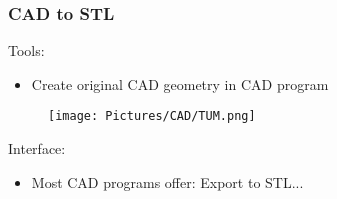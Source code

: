 
\begin{frame}
	\frametitle{CAD to STL}
	\begin{minipage}{0.85\textwidth}
	Tools:
		\begin{itemize}
		\item Create original CAD geometry in CAD program
		\end{itemize}
		\begin{figure}
		\texttt{[image: Pictures/CAD/TUM.png]}
		\end{figure}
		Interface:
		\begin{itemize}
		\item Most CAD programs offer: Export to STL...
		\end{itemize}
	\begin{figure}
	\end{figure}
	\end{minipage}
	\begin{minipage}{0.14\textwidth}
		\begin{figure}
					\\
					\\
					\\
					\\
					\\
		\end{figure}
	\end{minipage}
\end{frame}
